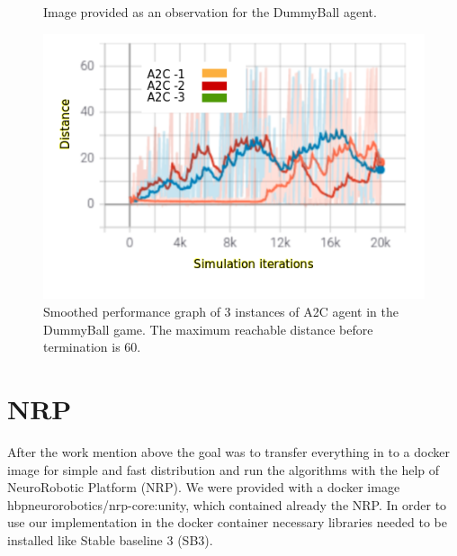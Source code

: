 \documentclass[conference]{IEEEtran}
\begin{document}
\begin{figure}[!t]
\centering
{}
\hfil
{}
\caption{Image provided as an observation for the DummyBall agent.}
\end{figure}

\begin{figure}[!t]
  \centering
  \includegraphics[width=1.0\linewidth]{images/A2C_randomness.png}
  \caption{Smoothed performance graph of 3 instances of A2C agent in the DummyBall game. The maximum reachable distance before termination is 60.}
\label{fig:DB_A2C}
\end{figure}

\section{NRP}
After the work mention above the goal was to transfer everything in to a docker image for simple and fast distribution and run the algorithms with the help of NeuroRobotic Platform (NRP). We were provided with a docker image hbpneurorobotics/nrp-core:unity, which contained already the NRP. In order to use our implementation in the docker container necessary libraries needed to be installed like Stable baseline 3 (SB3). 
\end{document}
